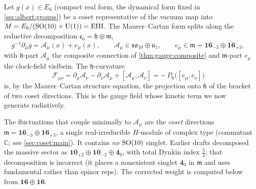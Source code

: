 Let $g(x)\in E_{6}$ (compact real form, the dynamical form fixed in
\autoref{sec:albert:groups}) be a coset representative of the
vacuum map into $M=E_{6}/(\mathrm{SO}(10)\times\mathrm{U}(1))=\mathrm{EIII}$. The
Maurer--Cartan form splits along the reductive decomposition
$\mathfrak e_{6}=\mathfrak h\oplus\mathfrak m$,
\begin{equation}\label{eq:app-ym:MC}
  g^{-1}\partial_{\mu}g
  = \mathcal A_{\mu}(x) + e_{\mu}(x),
  \qquad
  \mathcal A_{\mu}\in\mathfrak{so}_{10}\oplus\mathfrak u_{1},
  \qquad
  e_{\mu}\in\mathfrak m
  =\mathbf{16}_{-3}\oplus\overline{\mathbf{16}}_{+3},
\end{equation}
with $\mathfrak h$-part $\mathcal A_{\mu}$ the composite connection of
\autoref{thm:gauge:composite} and $\mathfrak m$-part $e_{\mu}$ the
clock-field vielbein. The $\mathfrak h$-curvature
\begin{equation}\label{eq:app-ym:curv}
  \mathcal F_{\mu\nu}
  =\partial_{\mu}\mathcal A_{\nu}-\partial_{\nu}\mathcal A_{\mu}
   +[\mathcal A_{\mu},\mathcal A_{\nu}]
  =-\,P_{\mathfrak h}\bigl([e_{\mu},e_{\nu}]\bigr)
\end{equation}
is, by the Maurer--Cartan structure equation, the projection onto
$\mathfrak h$ of the bracket of two coset directions. This is the gauge
field whose kinetic term we now generate radiatively.

\begin{remark}\label{rem:app-ym:multiplet}
The fluctuations that couple minimally to $\mathcal A_{\mu}$ are the
\emph{coset} directions $\mathfrak m=\mathbf{16}_{-3}\oplus
\overline{\mathbf{16}}_{+3}$, a single real-irreducible $H$-module of
complex type (commutant $\mathbb C$; see
\autoref{sec:coset:main}). It contains \emph{no} $\mathrm{SO}(10)$
singlet. Earlier drafts decomposed the massive sector as
$\mathbf{10}_{+2}\oplus\mathbf{10}_{-2}\oplus\mathbf 4_{0}$, with total
Dynkin index $\tfrac52$; that decomposition is incorrect (it places a
nonexistent singlet $\mathbf 4_{0}$ in $\mathfrak m$ and uses
fundamental rather than spinor reps). The corrected weight is computed
below from $\mathbf{16}\oplus\overline{\mathbf{16}}$.
\end{remark}

